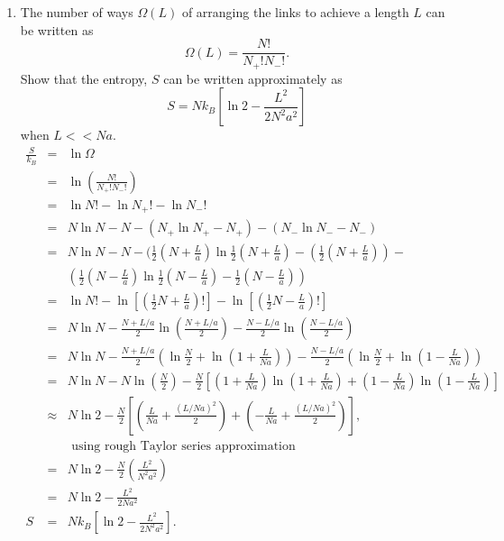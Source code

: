 \documentclass[12pt]{article}
\begin{document}
\begin{enumerate}
\begin{enumerate}
		\item The number of ways $\Omega (L)$ of arranging the links to achieve a length $L$ can be written as  $$\Omega(L) = \frac{N!}{N_+!N_-!}.$$
		Show that the entropy, $S$ can be written approximately as $$S = Nk_B \left[ \ln 2 - \frac{L^2}{2N^2 a^2} \right]$$
        when $L << Na$.
        \begin{eqnarray*}
            \frac{S}{k_B} &=& \ln \Omega \\
            &=& \ln \left( \frac{N!}{N_+! N_-!} \right) \\
            &=& \ln N! - \ln N_+! - \ln N_-! \\
            &=& N \ln N - N - (N_+ \ln N_+ - N_+) - (N_- \ln N_- - N_-) \\
            &=& N \ln N - N - (\frac{1}{2}(N+\frac{L}{a}) \ln \frac{1}{2}(N+\frac{L}{a}) - (\frac{1}{2}(N+\frac{L}{a})) - \\
            && (\frac{1}{2}(N-\frac{L}{a}) \ln \frac{1}{2}(N-\frac{L}{a}) - \frac{1}{2}(N-\frac{L}{a})) \\
            &=& \ln N! - \ln\!\left[\left(\tfrac{1}{2}N + \tfrac{L}{a}\right)!\right] - \ln\!\left[\left(\tfrac{1}{2}N - \tfrac{L}{a}\right)!\right] \\
            &=& N \ln N - \frac{N + L/a}{2}\ln\!\left(\frac{N + L/a}{2}\right) - \frac{N - L/a}{2}\ln\!\left(\frac{N - L/a}{2}\right) \\
            &=& N \ln N - \frac{N + L/a}{2}\left(\ln \frac{N}{2} + \ln\!\left(1 + \frac{L}{Na}\right)\right)
            - \frac{N - L/a}{2}\left(\ln \frac{N}{2} + \ln\!\left(1 - \frac{L}{Na}\right)\right) \\
            &=& N \ln N - N \ln\!\left(\frac{N}{2}\right)
            - \frac{N}{2}\left[\left(1 + \frac{L}{Na}\right)\ln\!\left(1 + \frac{L}{Na}\right)
            + \left(1 - \frac{L}{Na}\right)\ln\!\left(1 - \frac{L}{Na}\right)\right] \\
            &\approx& N \ln 2 - \frac{N}{2}\left[\left(\frac{L}{Na} + \frac{(L/Na)^2}{2}\right)
            + \left(-\frac{L}{Na} + \frac{(L/Na)^2}{2}\right)\right], \\
            && \mbox{ using rough Taylor series approximation} \\
            &=& N \ln 2 - \frac{N}{2}\left(\frac{L^2}{N^2 a^2}\right) \\
            &=& N \ln 2 - \frac{L^2}{2N a^2} \\
            S &=& N k_B \left[\ln 2 - \frac{L^2}{2N^2 a^2}\right].
        \end{eqnarray*}
	\end{enumerate}


\end{enumerate}
\end{document}
